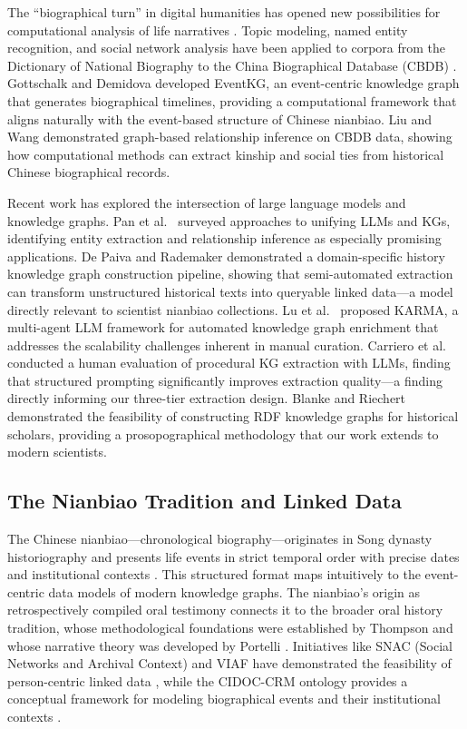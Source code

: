 \documentclass[review]{elsarticle}
\begin{document}
The ``biographical turn'' in digital humanities has opened new possibilities for computational analysis of life narratives \cite{sherratt2020biographical}. Topic modeling, named entity recognition, and social network analysis have been applied to corpora from the Dictionary of National Biography to the China Biographical Database (CBDB) \cite{bol2015china}. Gottschalk and Demidova \cite{gottschalk2019eventkg} developed EventKG, an event-centric knowledge graph that generates biographical timelines, providing a computational framework that aligns naturally with the event-based structure of Chinese nianbiao. Liu and Wang \cite{liu2017matrix} demonstrated graph-based relationship inference on CBDB data, showing how computational methods can extract kinship and social ties from historical Chinese biographical records.

Recent work has explored the intersection of large language models and knowledge graphs. Pan et al.\ \cite{pan2023unifying} surveyed approaches to unifying LLMs and KGs, identifying entity extraction and relationship inference as especially promising applications. De Paiva and Rademaker \cite{depaiva2024brazilian} demonstrated a domain-specific history knowledge graph construction pipeline, showing that semi-automated extraction can transform unstructured historical texts into queryable linked data—a model directly relevant to scientist nianbiao collections. Lu et al.\ \cite{lu2025karma} proposed KARMA, a multi-agent LLM framework for automated knowledge graph enrichment that addresses the scalability challenges inherent in manual curation. Carriero et al.\ \cite{carriero2024human} conducted a human evaluation of procedural KG extraction with LLMs, finding that structured prompting significantly improves extraction quality—a finding directly informing our three-tier extraction design. Blanke and Riechert \cite{blanke2020rdf} demonstrated the feasibility of constructing RDF knowledge graphs for historical scholars, providing a prosopographical methodology that our work extends to modern scientists.

\subsection{The Nianbiao Tradition and Linked Data}

The Chinese nianbiao---chronological biography---originates in Song dynasty historiography and presents life events in strict temporal order with precise dates and institutional contexts \cite{twitchett1962chinese,wilkinson2018chinese}. This structured format maps intuitively to the event-centric data models of modern knowledge graphs. The nianbiao's origin as retrospectively compiled oral testimony connects it to the broader oral history tradition, whose methodological foundations were established by Thompson \cite{thompson2000voice} and whose narrative theory was developed by Portelli \cite{portelli1991death}. Initiatives like SNAC (Social Networks and Archival Context) and VIAF have demonstrated the feasibility of person-centric linked data \cite{larson2015connecting}, while the CIDOC-CRM ontology provides a conceptual framework for modeling biographical events and their institutional contexts \cite{doerr2003cidoc}.
\end{document}
